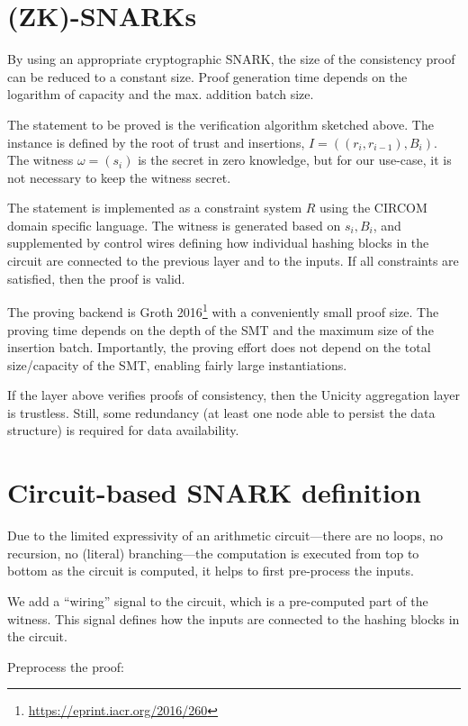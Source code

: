 \documentclass[twocolumn]{article}
\begin{document}
\section{(ZK)-SNARKs}

By using an appropriate cryptographic SNARK, the size of the consistency proof can be reduced to a constant size. Proof generation time depends on the logarithm of capacity and the max. addition batch size.

The statement to be proved is the verification algorithm sketched above. The instance is defined by the root of trust and insertions, $I = ((r_i, r_{i-1}),B_i)$. The witness $\omega = (s_i)$ is the secret in zero knowledge, but for our use-case, it is not necessary to keep the witness secret.

The statement is implemented as a constraint system $R$ using the CIRCOM domain specific language. The witness is generated based on $s_i, B_i$, and supplemented by control wires defining how individual hashing blocks in the circuit are connected to the previous layer and to the inputs. If all constraints are satisfied, then the proof is valid.

The proving backend is Groth 2016\footnote{\url{https://eprint.iacr.org/2016/260}} with a conveniently small proof size. The proving time depends on the depth of the SMT and the maximum size of the insertion batch. Importantly, the proving effort does not depend on the total size/capacity of the SMT, enabling fairly large instantiations.

If the layer above verifies proofs of consistency, then the Unicity aggregation layer is trustless. Still, some redundancy (at least one node able to persist the data structure) is required for data availability.


\section{Circuit-based SNARK definition}

Due to the limited expressivity of an arithmetic circuit---there are no loops, no recursion, no (literal) branching---the computation is executed from top to bottom as the circuit is computed, it helps to first pre-process the inputs.

We add a ``wiring'' signal to the circuit, which is a pre-computed part of the witness. This signal defines how the inputs are connected to the hashing blocks in the circuit.

Preprocess the proof:
\end{document}
